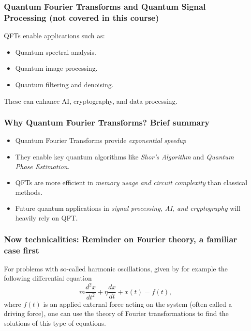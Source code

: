 \documentclass{beamer}
\begin{document}
\begin{frame}
\frametitle{Quantum Fourier Transforms and Quantum Signal Processing (not covered in this course)}

QFTs enable applications such as:
\begin{itemize}
\item Quantum spectral analysis.

\item Quantum image processing.

\item Quantum filtering and denoising.
\end{itemize}

\noindent
These can enhance AI, cryptography, and data processing.
\end{frame}

\begin{frame}
\frametitle{Why Quantum Fourier Transforms? Brief summary}

\begin{itemize}
\item Quantum Fourier Transforms provide \emph{exponential speedup}

\item They enable key quantum algorithms like \emph{Shor’s Algorithm} and \emph{Quantum Phase Estimation}.

\item QFTs are  more efficient in \emph{memory usage and circuit complexity} than classical methods.

\item Future quantum applications in \emph{signal processing, AI, and cryptography} will heavily rely on QFT.
\end{itemize}

\noindent
\end{frame}

\begin{frame}
\frametitle{Now technicalities: Reminder on Fourier theory, a familiar case first}

For problems with so-called harmonic oscillations, given by for example the following differential equation
\[
m\frac{d^2x}{dt^2}+\eta\frac{dx}{dt}+x(t)=f(t),
\]
where $f(t)$ is an applied external force acting on the system (often
called a driving force), one can use the theory of Fourier
transformations to find the solutions of this type of equations.
\end{frame}
\end{document}
